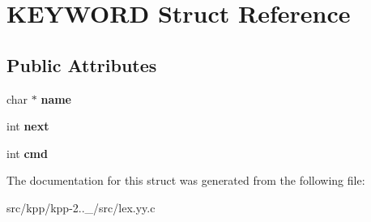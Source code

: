 \hypertarget{structKEYWORD}{}\section{K\+E\+Y\+W\+O\+RD Struct Reference}
\label{structKEYWORD}
\subsection*{Public Attributes}
\begin{DoxyCompactItemize}
\item 
\mbox{\label{structKEYWORD_aa823c8cc2b7652e32fc180e3e713eba8}} 
char $\ast$ {\bfseries name}
\item 
\mbox{\label{structKEYWORD_a3231c28058fcd7611c20d032abf8c13a}} 
int {\bfseries next}
\item 
\mbox{\label{structKEYWORD_a205917bc5b91602a3002a6f893a4127f}} 
int {\bfseries cmd}
\end{DoxyCompactItemize}


The documentation for this struct was generated from the following file\+:\begin{DoxyCompactItemize}
\item 
src/kpp/kpp-\/2..\+\_/src/lex.\+yy.\+c\end{DoxyCompactItemize}
